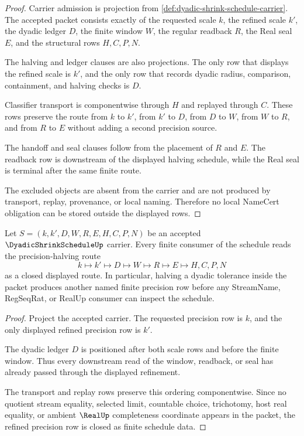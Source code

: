 \begin{proof}
Carrier admission is projection from \autoref{def:dyadic-shrink-schedule-carrier}. The accepted packet consists exactly of the requested scale $k$, the refined scale $k'$, the dyadic ledger $D$, the finite window $W$, the regular readback $R$, the Real seal $E$, and the structural rows $H,C,P,N$.

The halving and ledger clauses are also projections. The only row that displays the refined scale is $k'$, and the only row that records dyadic radius, comparison, containment, and halving checks is $D$.

Classifier transport is componentwise through $H$ and replayed through $C$. These rows preserve the route from $k$ to $k'$, from $k'$ to $D$, from $D$ to $W$, from $W$ to $R$, and from $R$ to $E$ without adding a second precision source.

The handoff and seal clauses follow from the placement of $R$ and $E$. The readback row is downstream of the displayed halving schedule, while the Real seal is terminal after the same finite route.

The excluded objects are absent from the carrier and are not produced by transport, replay, provenance, or local naming. Therefore no local NameCert obligation can be stored outside the displayed rows.
\end{proof}

\begin{theorem}
\label{thm:dyadic-shrink-schedule-halving-closure}
Let $S=(k,k',D,W,R,E,H,C,P,N)$ be an accepted $\DyadicShrinkScheduleUp$ carrier. Every finite consumer of the schedule reads the precision-halving route
$$
k \longmapsto k' \longmapsto D \longmapsto W \longmapsto R \longmapsto E \longmapsto H,C,P,N
$$
as a closed displayed route. In particular, halving a dyadic tolerance inside the packet produces another named finite precision row before any StreamName, RegSeqRat, or RealUp consumer can inspect the schedule.
\end{theorem}
\begin{proof}
Project the accepted carrier. The requested precision row is $k$, and the only displayed refined precision row is $k'$.

The dyadic ledger $D$ is positioned after both scale rows and before the finite window. Thus every downstream read of the window, readback, or seal has already passed through the displayed refinement.

The transport and replay rows preserve this ordering componentwise. Since no quotient stream equality, selected limit, countable choice, trichotomy, host real equality, or ambient $\RealUp$ completeness coordinate appears in the packet, the refined precision row is closed as finite schedule data.
\end{proof}

